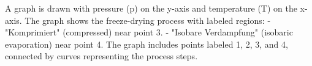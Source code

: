 A graph is drawn with pressure (p) on the y-axis and temperature (T) on the x-axis. The graph shows the freeze-drying process with labeled regions:  
- "Komprimiert" (compressed) near point 3.  
- "Isobare Verdampfung" (isobaric evaporation) near point 4.  
The graph includes points labeled 1, 2, 3, and 4, connected by curves representing the process steps.